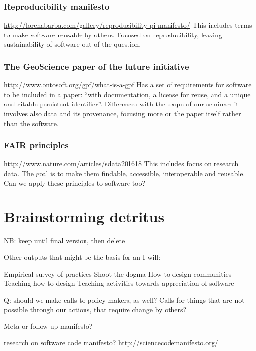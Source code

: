 \documentclass[a4paper,UKenglish]{dagman}
\renewcommand{\paragraph}[1]{\subsubsection*{#1}\xspace}
\begin{document}
\begin{appendix}
\paragraph{Reproducibility manifesto}
\url{http://lorenabarba.com/gallery/reproducibility-pi-manifesto/}
\cite{barba_reproducibility_2012}
This includes terms to make software reusable by others. Focused on reproducibility, leaving sustainability of software out of the question.

\paragraph{The GeoScience paper of the future initiative}
\url{http://www.ontosoft.org/gpf/what-is-a-gpf}
\cite{onto_soft_what_2016}
Has a set of requirements for software to be included in a paper: ``with documentation, a license for reuse, and a unique and citable persistent identifier''. Differences with the scope of our seminar: it involves also data and its provenance, focusing more on the paper itself rather than the software.

\paragraph{FAIR principles}
\url{http://www.nature.com/articles/sdata201618}
\cite{wilkinson_fair_2016}
This includes focus on research data. The goal is to make them findable, accessible, interoperable and reusable. Can we apply these principles to software too?



\section*{Brainstorming detritus}

NB: keep until final version, then delete

Other outputs that might be the basis for an I will:

Empirical survey of practices
Shoot the dogma
How to design communities
Teaching how to design
Teaching activities towards appreciation of software

Q: should we make calls to policy makers, as well? Calls for things that are not possible through our actions, that require change by others? 

Meta or follow-up manifesto?

research on software code manifesto?
\url{http://sciencecodemanifesto.org/}



\end{appendix}
\end{document}
